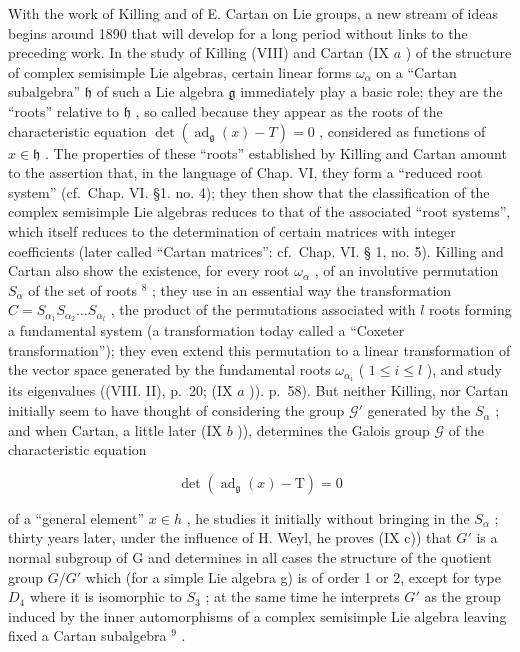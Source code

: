 With the work of Killing and of E. Cartan on Lie groups, a new stream of ideas begins around 1890 that will develop for a long period without links to the preceding work. In the study of Killing (VIII) and Cartan (IX \(a\) ) of the structure of complex semisimple Lie algebras, certain linear forms \(\omega_{\alpha}\) on a ``Cartan subalgebra'' \(\mathfrak{h}\) of such a Lie algebra \(\mathfrak{g}\) immediately play a basic role; they are the ``roots'' relative to \(\mathfrak{h}\) , so called because they appear as the roots of the characteristic equation \(\det(\operatorname{ad}_{\mathfrak{g}}(x)-T)=0\) , considered as functions of \(x\in\mathfrak{h}\) . The properties of these ``roots'' established by Killing and Cartan amount to the assertion that, in the language of Chap. VI, they form a ``reduced root system'' (cf.~Chap. VI. §1. no. 4); they then show that the classification of the complex semisimple Lie algebras reduces to that of the associated ``root systems'', which itself reduces to the determination of certain matrices with integer coefficients (later called ``Cartan matrices'': cf.~Chap. VI. § 1, no. 5). Killing and Cartan also show the existence, for every root \(\omega_{\alpha}\) , of an involutive permutation \(S_{\alpha}\) of the set of roots \(^{8}\) ; they use in an essential way the transformation \(C = S_{\alpha_1}S_{\alpha_2} \ldots S_{\alpha_l}\) , the product of the permutations associated with \(l\) roots forming a fundamental system (a transformation today called a ``Coxeter transformation''); they even extend this permutation to a linear transformation of the vector space generated by the fundamental roots \(\omega_{\alpha_i}\) ( \(1 \leqslant i \leqslant l\) ), and study its eigenvalues ((VIII. II), p.~20; (IX \(a\) )). p.~58). But neither Killing, nor Cartan initially seem to have thought of considering the group \(\mathcal{G}'\) generated by the \(S_{\alpha}\) ; and when Cartan, a little later (IX \(b\) )), determines the Galois group \(\mathcal{G}\) of the characteristic equation

\[
\det (\operatorname{ad} _ {\mathfrak {g}} (x) - \mathrm{T}) = 0
\]

of a ``general element'' \(x \in h\) , he studies it initially without bringing in the \(S_{\alpha}\) ; thirty years later, under the influence of H. Weyl, he proves (IX c)) that \(G'\) is a normal subgroup of G and determines in all cases the structure of the quotient group \(G/G'\) which (for a simple Lie algebra g) is of order 1 or 2, except for type \(D_{4}\) where it is isomorphic to \(S_{3}\) ; at the same time he interprets \(G'\) as the group induced by the inner automorphisms of a complex semisimple Lie algebra leaving fixed a Cartan subalgebra \(^{9}\) .

